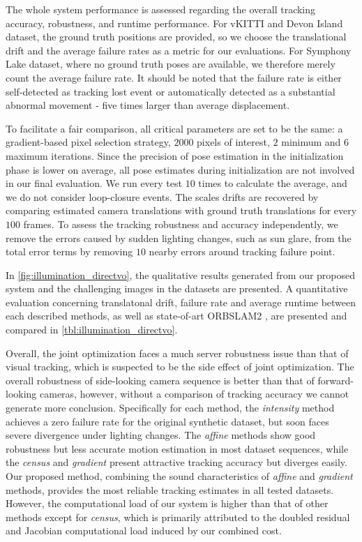 The whole system performance is assessed regarding the overall tracking accuracy, robustness, and runtime performance. 
For vKITTI and Devon Island dataset, the ground truth positions are provided, so we choose the translational drift and the average failure rates as a metric for our evaluations. 
For Symphony Lake dataset, where no ground truth poses are available, we therefore merely count the average failure rate. 
It should be noted that the failure rate is either self-detected as tracking lost event or automatically detected as a substantial abnormal movement - five times larger than average displacement.  

To facilitate a fair comparison, all critical parameters are set to be the same: a gradient-based pixel selection strategy, $2000$ pixels of interest, $2$ minimum and $6$ maximum iterations. 
Since the precision of pose estimation in the initialization phase is lower on average, all pose estimates during initialization are not involved in our final evaluation. 
We run every test $10$ times to calculate the average, and we do not consider loop-closure events. 
The scales drifts are recovered by comparing estimated camera translations with ground truth translations for every $100$ frames. 
To assess the tracking robustness and accuracy independently, we remove the errors caused by sudden lighting changes, such as sun glare, from the total error terms by removing $10$ nearby errors around tracking failure point. 

In \ref{fig:illumination_directvo}, the qualitative results generated from our proposed system and the challenging images in the datasets are presented. 
A quantitative evaluation concerning translatonal drift, failure rate and average runtime between each described methods, as well as state-of-art ORBSLAM2 \cite{mur2017orb}, are presented and compared in \ref{tbl:illumination_directvo}. 

Overall, the joint optimization faces a much server robustness issue than that of visual tracking, which is suspected to be the side effect of joint optimization. The overall robustness of side-looking camera sequence is better than that of forward-looking cameras, however, without a comparison of tracking accuracy we cannot generate more conclusion. Specifically for each method, the {\em intensity} method achieves a zero failure rate for the original synthetic dataset, but soon faces severe divergence under lighting changes. The {\em affine} methods show good robustness but less accurate motion estimation in most dataset sequences, while the {\em census} and {\em gradient} present attractive tracking accuracy but diverges easily. Our proposed method, combining the sound characteristics of {\em affine} and {\em gradient} methods, provides the most reliable tracking estimates in all tested datasets. However, the computational load of our system is higher than that of other methods except for {\em census}, which is primarily attributed to the doubled residual and Jacobian computational load induced by our combined cost. 

